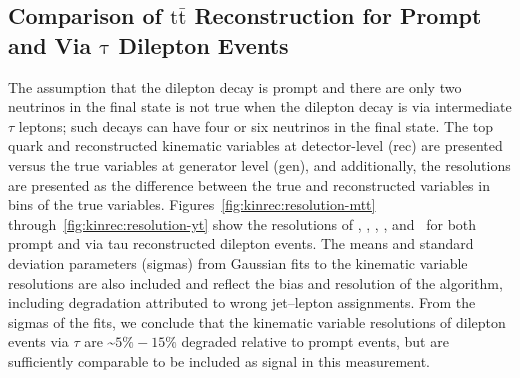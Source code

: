 \clearpage
\subsection{Comparison of \ensuremath{\mathrm{t\bar{t}}} Reconstruction for Prompt and Via \ensuremath{\mathrm{\tau}} Dilepton Events}
The assumption that the dilepton decay is prompt and there are only two neutrinos in the final state is not true when the dilepton decay is via intermediate $\tau$ leptons; such decays can have four or six neutrinos in the final state.
The top quark and \ttbar reconstructed kinematic variables at detector-level (rec) are presented versus the true variables at generator level (gen), and additionally, the resolutions are presented as the difference between the true and reconstructed variables in bins of the true variables. 
Figures~\ref{fig:kinrec:resolution-mtt} through~\ref{fig:kinrec:resolution-yt} show the resolutions of \mtt, \ytt, \pttt, \yt, and \ptt\ for both prompt and via tau reconstructed \ttbar dilepton events. 
The means and standard deviation parameters (sigmas) from Gaussian fits to the kinematic variable resolutions are also included and reflect the bias and resolution of the algorithm, including degradation attributed to wrong jet--lepton assignments. 
From the sigmas of the fits, we conclude that the kinematic variable resolutions of \ttbar dilepton events via $\tau$ are \sim$5\% - 15\%$ degraded relative to prompt events, but are sufficiently comparable to be included as signal in this measurement.

